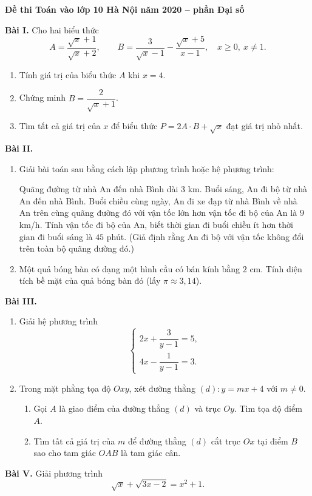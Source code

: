 \documentclass[12pt,a4paper]{article}
\begin{document}
\begin{center}
{\Large\bfseries Đề thi Toán vào lớp 10 Hà Nội năm 2020 -- phần Đại số}
\end{center}

\textbf{Bài I.} Cho hai biểu thức
\[
A=\frac{\sqrt{x}+1}{\sqrt{x}+2},\qquad
B=\frac{3}{\sqrt{x}-1}-\frac{\sqrt{x}+5}{x-1},
\quad x\ge 0,\ x\ne 1.
\]
\begin{enumerate}[label=\arabic*)]
  \item Tính giá trị của biểu thức $A$ khi $x=4$.
  \item Chứng minh $B=\dfrac{2}{\sqrt{x}+1}$.
  \item Tìm tất cả giá trị của $x$ để biểu thức $P=2A\cdot B+\sqrt{x}$ đạt giá trị nhỏ nhất.
\end{enumerate}

\textbf{Bài II.}
\begin{enumerate}[label=\arabic*)]
  \item Giải bài toán sau bằng cách lập phương trình hoặc hệ phương trình:

  Quãng đường từ nhà An đến nhà Bình dài $3$ km. Buổi sáng, An đi bộ từ nhà An đến nhà Bình. Buổi chiều cùng ngày, An đi xe đạp từ nhà Bình về nhà An trên cùng quãng đường đó với vận tốc lớn hơn vận tốc đi bộ của An là $9$ km/h. Tính vận tốc đi bộ của An, biết thời gian đi buổi chiều ít hơn thời gian đi buổi sáng là $45$ phút. (Giả định rằng An đi bộ với vận tốc không đổi trên toàn bộ quãng đường đó.)
  \item Một quả bóng bàn có dạng một hình cầu có bán kính bằng $2$ cm. Tính diện tích bề mặt của quả bóng bàn đó (lấy $\pi\approx 3{,}14$).
\end{enumerate}

\textbf{Bài III.}
\begin{enumerate}[label=\arabic*)]
  \item Giải hệ phương trình
  \[
  \begin{cases}
  2x+\dfrac{3}{y-1}=5,\\[4pt]
  4x-\dfrac{1}{y-1}=3.
  \end{cases}
  \]
  \item Trong mặt phẳng tọa độ $Oxy$, xét đường thẳng $(d):y=mx+4$ với $m\ne 0$.
  \begin{enumerate}[label=\alph*)]
    \item Gọi $A$ là giao điểm của đường thẳng $(d)$ và trục $Oy$. Tìm tọa độ điểm $A$.
    \item Tìm tất cả giá trị của $m$ để đường thẳng $(d)$ cắt trục $Ox$ tại điểm $B$ sao cho tam giác $OAB$ là tam giác cân.
  \end{enumerate}
\end{enumerate}

\textbf{Bài V.} Giải phương trình
\[
\sqrt{x}+\sqrt{3x-2}=x^2+1.
\]
\end{document}
